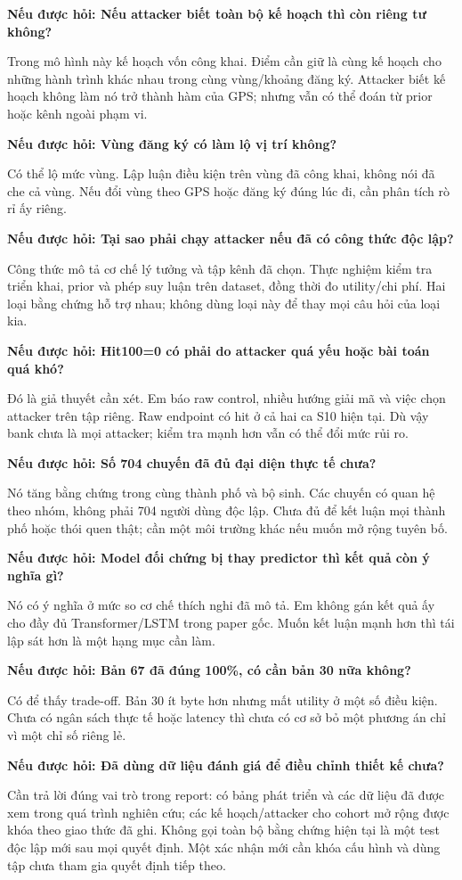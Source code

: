 \documentclass[10pt,a4paper]{article}
\newcommand{\ask}[2]{\par\textbf{Nếu được hỏi: #1}\par #2\par}
\begin{document}
\ask{Nếu attacker biết toàn bộ kế hoạch thì còn riêng tư không?}{Trong mô hình này kế hoạch vốn công khai. Điểm cần giữ là cùng kế hoạch cho những hành trình khác nhau trong cùng vùng/khoảng đăng ký. Attacker biết kế hoạch không làm nó trở thành hàm của GPS; nhưng vẫn có thể đoán từ prior hoặc kênh ngoài phạm vi.}

\ask{Vùng đăng ký có làm lộ vị trí không?}{Có thể lộ mức vùng. Lập luận điều kiện trên vùng đã công khai, không nói đã che cả vùng. Nếu đổi vùng theo GPS hoặc đăng ký đúng lúc đi, cần phân tích rò rỉ ấy riêng.}

\ask{Tại sao phải chạy attacker nếu đã có công thức độc lập?}{Công thức mô tả cơ chế lý tưởng và tập kênh đã chọn. Thực nghiệm kiểm tra triển khai, prior và phép suy luận trên dataset, đồng thời đo utility/chi phí. Hai loại bằng chứng hỗ trợ nhau; không dùng loại này để thay mọi câu hỏi của loại kia.}

\ask{Hit100=0 có phải do attacker quá yếu hoặc bài toán quá khó?}{Đó là giả thuyết cần xét. Em báo raw control, nhiều hướng giải mã và việc chọn attacker trên tập riêng. Raw endpoint có hit ở cả hai ca S10 hiện tại. Dù vậy bank chưa là mọi attacker; kiểm tra mạnh hơn vẫn có thể đổi mức rủi ro.}

\ask{Số 704 chuyến đã đủ đại diện thực tế chưa?}{Nó tăng bằng chứng trong cùng thành phố và bộ sinh. Các chuyến có quan hệ theo nhóm, không phải 704 người dùng độc lập. Chưa đủ để kết luận mọi thành phố hoặc thói quen thật; cần một môi trường khác nếu muốn mở rộng tuyên bố.}

\ask{Model đối chứng bị thay predictor thì kết quả còn ý nghĩa gì?}{Nó có ý nghĩa ở mức so cơ chế thích nghi đã mô tả. Em không gán kết quả ấy cho đầy đủ Transformer/LSTM trong paper gốc. Muốn kết luận mạnh hơn thì tái lập sát hơn là một hạng mục cần làm.}

\ask{Bản 67 đã đúng 100\%, có cần bản 30 nữa không?}{Có để thấy trade-off. Bản 30 ít byte hơn nhưng mất utility ở một số điều kiện. Chưa có ngân sách thực tế hoặc latency thì chưa có cơ sở bỏ một phương án chỉ vì một chỉ số riêng lẻ.}

\ask{Đã dùng dữ liệu đánh giá để điều chỉnh thiết kế chưa?}{Cần trả lời đúng vai trò trong report: có bảng phát triển và các dữ liệu đã được xem trong quá trình nghiên cứu; các kế hoạch/attacker cho cohort mở rộng được khóa theo giao thức đã ghi. Không gọi toàn bộ bằng chứng hiện tại là một test độc lập mới sau mọi quyết định. Một xác nhận mới cần khóa cấu hình và dùng tập chưa tham gia quyết định tiếp theo.}
\end{document}
